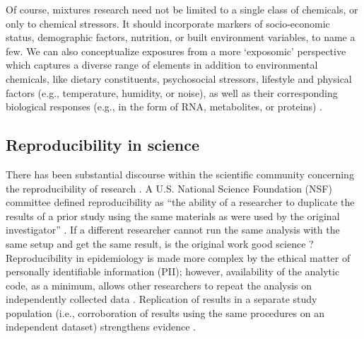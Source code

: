 Of course, mixtures research need not be limited to a single class of chemicals, or only to chemical stressors. It should incorporate markers of socio-economic status, demographic factors, nutrition, or built environment variables, to name a few. We can also conceptualize exposures from a more `exposomic' perspective which captures a diverse range of elements in addition to environmental chemicals, like dietary constituents, psychosocial stressors, lifestyle and physical factors (e.g., temperature, humidity, or noise), as well as their corresponding biological responses (e.g., in the form of RNA, metabolites, or proteins) \citep{vermeulen2020exposome}.

\subsection{Reproducibility in science}\label{sec:repro}
There has been substantial discourse within the scientific community concerning the reproducibility of research \citep{baker20161}. A U.S. National Science Foundation (NSF) committee defined reproducibility as ``the ability of a researcher to duplicate the results of a prior study using the same materials as were used by the original investigator'' \citep{cacioppo2015social}. If a different researcher cannot run the same analysis with the same setup and get the same result, is the original work good science \citep{goodman2016does}? Reproducibility in epidemiology is made more complex by the ethical matter of personally identifiable information (PII); however, availability of the analytic code, as a minimum, allows other researchers to repeat the analysis on independently collected data \citep{peng2011reproducible}. Replication of results in a separate study population (i.e., corroboration of results using the same procedures on an independent dataset) strengthens evidence \citep{peng2006reproducible}.

